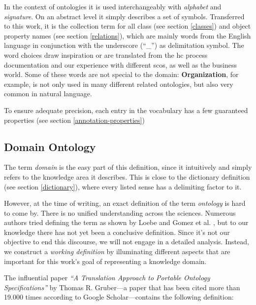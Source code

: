 \documentclass[a4paper, DIV=13, BCOR=0cm]{scrbook}
\begin{document}
In the context of ontologies it is used interchangeably with \textit{alphabet} and \textit{signature}. On an abstract level it simply describes a set of symbols. \cite[p.\,46]{loebe2015ontological} Transferred to this work, it is the collection term for all class (see section \ref{classes}) and object property names (see section \ref{relations}), which are mainly words from the English language in conjunction with the underscore (\enquote{\_}) as delimitation symbol. The word choices draw inspiration or are translated from the \gls{hc} process documentation and our experience with different \glspl{sco}, as well as the business world. Some of these words are not special to the domain: \textbf{Organization}, for example, is not only used in many different related ontologies, but also very common in natural language.

To ensure adequate precision, each entry in the vocabulary has a few guaranteed properties (see section \ref{annotation-properties})

\subsection{Domain Ontology }
The term \textit{domain} is the easy part of this definition, since it intuitively and simply refers to the knowledge area it describes. \cite[p.\,7]{loebe2015ontological} This is close to the dictionary definition (see section \ref{dictionary}), where every listed sense has a delimiting factor to it.

However, at the time of writing, an exact definition of the term \textit{ontology} is hard to come by. There is no unified understanding across the sciences. \cite{Hesse_2014} Numerous authors tried defining the term as shown by Loebe \cite[p.\,4-6]{loebe2015ontological} and Gomez et al. \cite[p.\, 6--9]{Gomez-Perez:2004aa}, but to our knowledge there has not yet been a conclusive definition. Since it's not our objective to end this discourse, we will not engage in a detailed analysis. Instead, we construct a \textit{working definition} by illuminating different aspects that are important for this work's goal of representing a knowledge domain.

The influential paper \cite[p.\,9]{schulz2012guideline} \cite[p.\,4]{loebe2015ontological} \textit{\enquote{A Translation Approach to Portable Ontology Specifications}} by Thomas R. Gruber---a paper that has been cited more than 19.000 times according to Google Scholar---contains the following definition:
\end{document}
